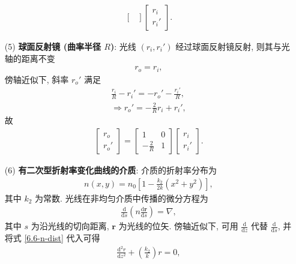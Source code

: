 \documentclass{note}
\begin{document}
\begin{pf}
\begin{itemize}
\begin{align}
\begin{bmatrix}
            \end{bmatrix}\begin{bmatrix}
                r_i\\
                r_i'
            \end{bmatrix}.
        \end{align}
        \item[(5)] \textbf{球面反射镜 (曲率半径 $R$)}: 光线 $(r_i,r_i')$ 经过球面反射镜反射, 则其与光轴的距离不变
        \begin{align}
            r_o=r_i,
        \end{align}
        傍轴近似下, 斜率 $r_o'$ 满足
        \begin{gather}
            \frac{r_i}{R}-r_i'=-r_o'-\frac{r_i'}{R},\\
            \Longrightarrow r_o'=-\frac{2}{R}r_i+r_i',
        \end{gather}
        故
        \begin{align}
            \begin{bmatrix}
                r_o\\
                r_o'
            \end{bmatrix}=\begin{bmatrix}
                1&0\\
                -\frac{2}{R}&1
            \end{bmatrix}\begin{bmatrix}
                r_i\\
                r_i'
            \end{bmatrix}.
        \end{align}
        \item[(6)] \textbf{有二次型折射率变化曲线的介质}: 介质的折射率分布为
        \begin{align}
            \label{6.6-n-dist}
            n(x,y)=n_0\left[1-\frac{k_2}{2k}(x^2+y^2)\right],
        \end{align}
        其中 $k_2$ 为常数. 光线在非均匀介质中传播的微分方程为
        \begin{align}
            \frac{\mathrm{d}}{\mathrm{d}s}\left(n\frac{\mathrm{d}\bm{r}}{\mathrm{d}s}\right)=\nabla,
        \end{align}
        其中 $s$ 为沿光线的切向距离, $\bm{r}$ 为光线的位矢. 傍轴近似下, 可用 $\frac{\mathrm{d}}{\mathrm{d}z}$ 代替 $\frac{\mathrm{d}}{\mathrm{d}s}$, 并将式 \eqref{6.6-n-dist} 代入可得
        \begin{align}
            \frac{\mathrm{d}^2r}{\mathrm{d}z^2}+\left(\frac{k_2}{k}\right)r=0,

\end{align}
\end{itemize}
\end{pf}
\end{document}

